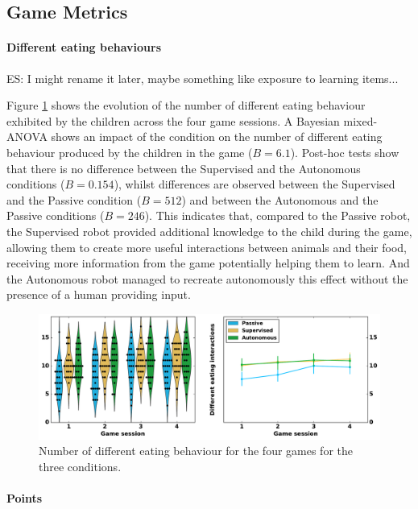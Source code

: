 \subsection{Game Metrics}

\paragraph{Different eating behaviours}

ES: I might rename it later, maybe something like exposure to learning items...

Figure \ref{fig:tutoring_d_eat} shows the evolution of the number of different eating behaviour exhibited by the children across the four game sessions. A Bayesian mixed-ANOVA shows an impact of the condition on the number of different eating behaviour produced by the children in the game ($B=6.1$). Post-hoc tests show that there is no difference between the Supervised and the Autonomous conditions ($B=0.154$), whilst differences are observed between the Supervised and the Passive condition ($B=512$) and between the Autonomous and the Passive conditions ($B=246$). This indicates that, compared to the Passive robot, the Supervised robot provided additional knowledge to the child during the game, allowing them to create more useful interactions between animals and their food, receiving more information from the game potentially helping them to learn. And the Autonomous robot managed to recreate autonomously this effect without the presence of a human providing input.

\begin{figure}[ht]
	\includegraphics[width=1\linewidth]{d_eat.pdf}
	\centering
	\caption{Number of different eating behaviour for the four games for the three conditions.}
	\label{fig:tutoring_d_eat}
\end{figure}

\paragraph{Points}

